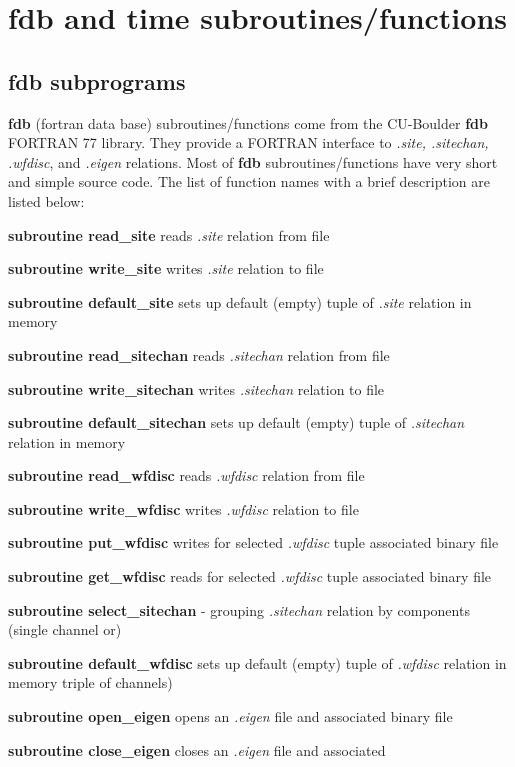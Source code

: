 \section {fdb and time subroutines/functions}
\subsection {fdb subprograms}
{\bf fdb} (fortran data base) subroutines/functions come from the CU-Boulder {\bf fdb }
FORTRAN 77 library. They
provide a FORTRAN interface to {\it .site, .sitechan, .wfdisc},
and {\it .eigen} relations. Most of {\bf fdb} subroutines/functions have
very short and simple source code. The list of function names with a
brief description are listed below:
\begin{description}
\item{\bf subroutine read\_site}  reads {\it .site} relation from file
\item{\bf subroutine write\_site}  writes {\it .site} relation to file
\item{\bf subroutine default\_site}  sets up default (empty) tuple of 
{\it .site} relation in memory
\item{\bf subroutine read\_sitechan}  reads {\it .sitechan} relation from file
\item{\bf subroutine write\_sitechan}  writes {\it .sitechan} relation to file
\item{\bf subroutine default\_sitechan}  sets up default (empty) tuple of {\it .sitechan} relation in memory
\item{\bf subroutine read\_wfdisc}  reads {\it  .wfdisc} relation from file
\item{\bf subroutine write\_wfdisc}  writes {\it  .wfdisc} relation to file
\item{\bf subroutine put\_wfdisc}  writes for selected {\it .wfdisc} 
tuple associated binary file
\item{\bf subroutine get\_wfdisc}  reads for selected {\it .wfdisc} tuple 
associated binary file
\item{\bf subroutine select\_sitechan} - grouping {\it .sitechan} relation 
by components (single channel or)
\item{\bf subroutine default\_wfdisc}  sets up default (empty) tuple of 
{\it .wfdisc} relation in memory
triple of channels)
\item{\bf subroutine open\_eigen}  opens an {\it .eigen} file and associated 
binary file
\item{\bf subroutine close\_eigen}  closes an {\it .eigen} file and associated 

\end{description}
